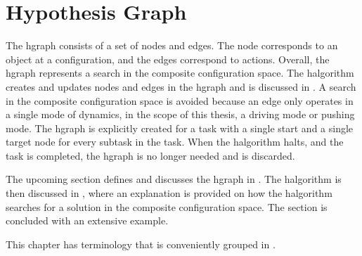 \section{Hypothesis Graph}%
\label{sec:hgraph}
The \acf{hgraph} consists of a set of nodes and edges. The node corresponds to an object at a configuration, and the edges correspond to actions. Overall, the \ac{hgraph} represents a search in the composite configuration space. The \ac{halgorithm} creates and updates nodes and edges in the \ac{hgraph} and is discussed in . A search in the composite configuration space is avoided because an edge only operates in a single mode of dynamics, in the scope of this thesis, a driving mode or pushing mode. The \ac{hgraph} is explicitly created for a task with a single start and a single target node for every subtask in the task. When the \ac{halgorithm} halts, and the task is completed, the \ac{hgraph} is no longer needed and is discarded.\bs

The upcoming section defines and discusses the \ac{hgraph} in . The \ac{halgorithm} is then discussed in , where an explanation is provided on how the \ac{halgorithm} searches for a solution in the composite configuration space. The section is concluded with an extensive example.\bs



This chapter has terminology that is conveniently grouped in .\bs

